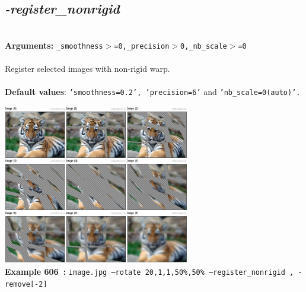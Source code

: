 \documentclass[a4paper,11pt,twoside]{book}
\begin{document}
\subsection{\emph{-register\_nonrigid} }\vspace*{-0.5em}
~\\\textbf{Arguments: } 
{\small \texttt{\_smoothness$>$=0,\_precision$>$0,\_nb\_scale$>$=0}}\\~\\
Register selected images with non-rigid warp.
~\\~\\\textbf{Default values}: {\small \texttt{'smoothness=0.2', 'precision=6'} and \texttt{'nb\_scale=0(auto)'.}}
\begin{center}\includegraphics[keepaspectratio=true,height=7cm,width=\textwidth]{img/gmic_def606.jpg}\\
{\footnotesize \textbf{Example 606~:} \texttt{image.jpg --rotate 20,1,1,50\%,50\% --register\_nonrigid , -remove[-2]}}
\end{center}
\end{document}
